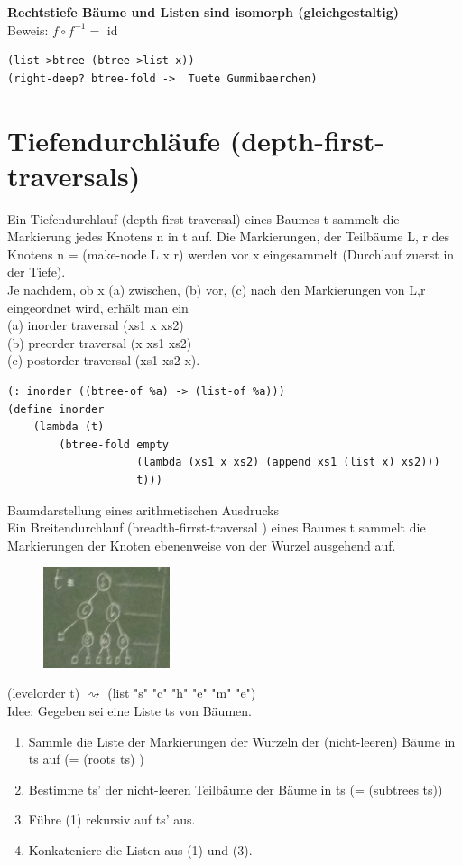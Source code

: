 \documentclass[a4paper, 20pt, openany]{book}
\begin{document}
\textbf{Rechtstiefe Bäume und Listen sind isomorph (gleichgestaltig)}\\
Beweis: $f \circ f^{-1} =$ id\\
\begin{lstlisting}
(list->btree (btree->list x))
(right-deep? btree-fold ->  Tuete Gummibaerchen)
\end{lstlisting}

\section{Tiefendurchläufe (depth-first-traversals)}
Ein Tiefendurchlauf (depth-first-traversal) eines Baumes t sammelt die Markierung jedes Knotens n in t auf. Die Markierungen, der Teilbäume L, r des Knotens n = (make-node L x r) werden vor x eingesammelt (Durchlauf zuerst in der Tiefe).\\
Je nachdem, ob x  (a) zwischen, (b) vor, (c) nach den Markierungen von L,r eingeordnet wird, erhält man  ein \\
(a) inorder traversal (xs1 x xs2)\\
(b) preorder traversal (x xs1 xs2)\\
 (c) postorder traversal (xs1 xs2 x).
\begin{lstlisting}
(: inorder ((btree-of %a) -> (list-of %a)))
(define inorder
	(lambda (t)
		(btree-fold empty
					(lambda (xs1 x xs2) (append xs1 (list x) xs2)))
					t)))

\end{lstlisting}
Baumdarstellung eines arithmetischen Ausdrucks \\
Ein Breitendurchlauf (breadth-firrst-traversal ) eines Baumes t sammelt die Markierungen der Knoten ebenenweise von der Wurzel ausgehend auf.\\

\begin{figure}[ht]
	\centering
  \includegraphics[width=0.33\textwidth, angle=0]{btree-scheme.jpg}
	\label{fig1}
\end{figure}


(levelorder t) $\rightsquigarrow$ (list "s" "c" "h" "e" "m" "e")\\
Idee: Gegeben sei eine Liste ts von Bäumen.
\begin{enumerate}
\item Sammle die Liste der Markierungen der Wurzeln der (nicht-leeren) Bäume in ts auf (= (roots ts) )
\item Bestimme ts' der nicht-leeren Teilbäume der Bäume in ts (= (subtrees ts))
\item Führe (1) rekursiv auf ts' aus.
\item Konkateniere die Listen aus  (1) und (3).
\end{enumerate}
\end{document}
